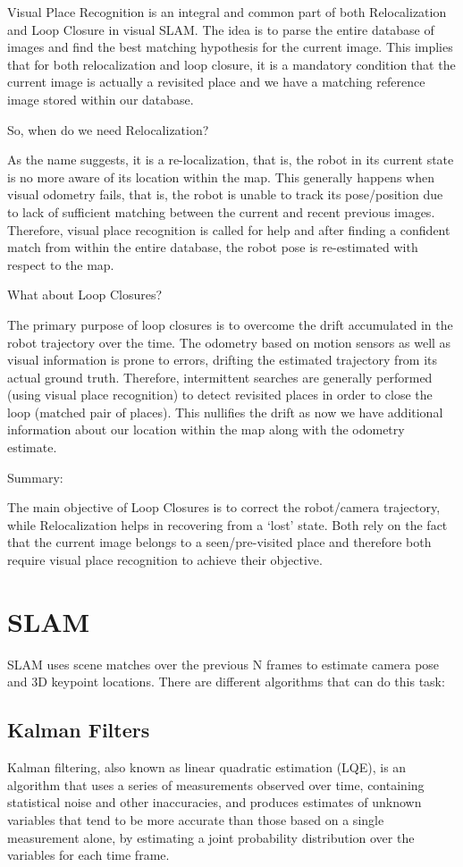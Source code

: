 \begin{enumerate}
Visual Place Recognition is an integral and common part of both Relocalization and Loop Closure in visual SLAM. The idea is to parse the entire database of images and find the best matching hypothesis for the current image. This implies that for both relocalization and loop closure, it is a mandatory condition that the current image is actually a revisited place and we have a matching reference image stored within our database.

So, when do we need Relocalization?

As the name suggests, it is a re-localization, that is, the robot in its current state is no more aware of its location within the map. This generally happens when visual odometry fails, that is, the robot is unable to track its pose/position due to lack of sufficient matching between the current and recent previous images. Therefore, visual place recognition is called for help and after finding a confident match from within the entire database, the robot pose is re-estimated with respect to the map.

What about Loop Closures?

The primary purpose of loop closures is to overcome the drift accumulated in the robot trajectory over the time. The odometry based on motion sensors as well as visual information is prone to errors, drifting the estimated trajectory from its actual ground truth. Therefore, intermittent searches are generally performed (using visual place recognition) to detect revisited places in order to close the loop (matched pair of places). This nullifies the drift as now we have additional information about our location within the map along with the odometry estimate.

Summary:

The main objective of Loop Closures is to correct the robot/camera trajectory, while Relocalization helps in recovering from a ‘lost’ state. Both rely on the fact that the current image belongs to a seen/pre-visited place and therefore both require visual place recognition to achieve their objective.


\section{SLAM}

SLAM uses scene matches over the previous N frames to estimate camera pose and 3D keypoint locations. There are different algorithms that can do this task:

\subsection{Kalman Filters}
Kalman filtering, also known as linear quadratic estimation (LQE), is an algorithm that uses a series of measurements observed over time, containing statistical noise and other inaccuracies, and produces estimates of unknown variables that tend to be more accurate than those based on a single measurement alone, by estimating a joint probability distribution over the variables for each time frame.


\end{enumerate}
